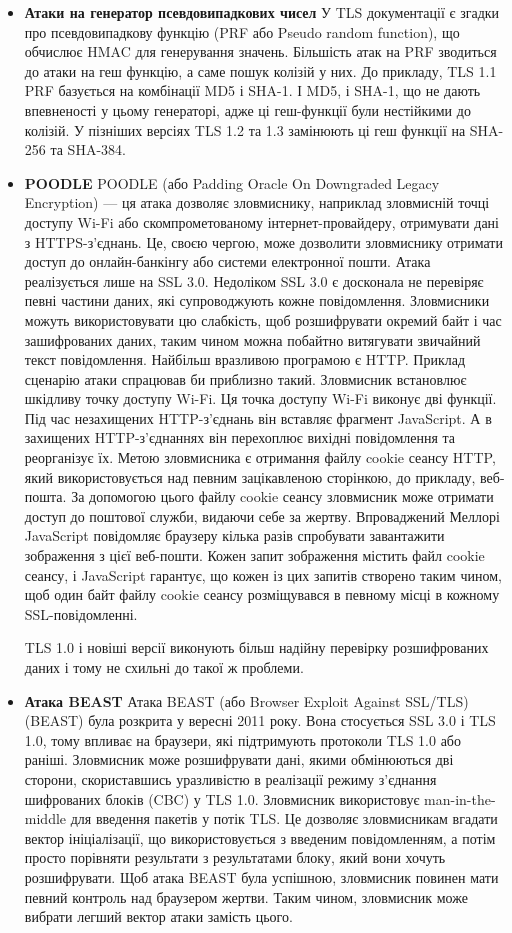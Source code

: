 \begin{itemize}
    \item \textbf{Атаки на генератор псевдовипадкових чисел}
    У TLS документації є згадки про псевдовипадкову функцію (PRF або Pseudo random function), що обчислює HMAC для генерування значень. Більшість атак на PRF зводиться до атаки на геш функцію, а саме пошук колізій у них. До прикладу, TLS 1.1 PRF базується на комбінації MD5 і SHA-1. І MD5, і SHA-1, що не дають впевненості у цьому генераторі, адже ці геш-функції були нестійкими до колізій. У пізніших версіях TLS 1.2 та 1.3 замінюють ці геш функції на SHA-256 та SHA-384.
    \item \textbf{POODLE}
    POODLE (або Padding Oracle On Downgraded Legacy Encryption) — ця атака дозволяє зловмиснику, наприклад зловмисній точці доступу Wi-Fi або скомпрометованому інтернет-провайдеру, отримувати дані з HTTPS-з’єднань. Це, своєю чергою, може дозволити зловмиснику отримати доступ до онлайн-банкінгу або системи електронної пошти.
    Атака реалізується лише на SSL 3.0. Недоліком SSL 3.0 є досконала не перевіряє певні частини даних, які супроводжують кожне повідомлення. Зловмисники можуть використовувати цю слабкість, щоб розшифрувати окремий байт і час зашифрованих даних, таким чином можна побайтно витягувати звичайний текст повідомлення.
    Найбільш вразливою програмою є HTTP. Приклад сценарію атаки спрацював би приблизно такий. Зловмисник встановлює шкідливу точку доступу Wi-Fi. Ця точка доступу Wi-Fi виконує дві функції. Під час незахищених HTTP-з’єднань він вставляє фрагмент JavaScript. А в захищених HTTP-з’єднаннях він перехоплює вихідні повідомлення та реорганізує їх. Метою зловмисника є отримання файлу cookie сеансу HTTP, який використовується над певним зацікавленою сторінкою, до прикладу, веб-пошта. За допомогою цього файлу cookie сеансу зловмисник може отримати доступ до поштової служби, видаючи себе за жертву. Впроваджений Меллорі JavaScript повідомляє браузеру кілька разів спробувати завантажити зображення з цієї веб-пошти. Кожен запит зображення містить файл cookie сеансу, і JavaScript гарантує, що кожен із цих запитів створено таким чином, щоб один байт файлу cookie сеансу розміщувався в певному місці в кожному SSL-повідомленні.
    
    TLS 1.0 і новіші версії виконують більш надійну перевірку розшифрованих даних і тому не схильні до такої ж проблеми.
    
    \item \textbf{Атака BEAST}
    Атака BEAST (або Browser Exploit Against SSL/TLS) (BEAST) була розкрита у вересні 2011 року. Вона стосується SSL 3.0 і TLS 1.0, тому впливає на браузери, які підтримують протоколи TLS 1.0 або раніші. Зловмисник може розшифрувати дані, якими обмінюються дві сторони, скориставшись уразливістю в реалізації режиму з’єднання шифрованих блоків (CBC) у TLS 1.0.
    Зловмисник використовує man-in-the-middle для введення пакетів у потік TLS. Це дозволяє зловмисникам вгадати вектор ініціалізації, що використовується з введеним повідомленням, а потім просто порівняти результати з результатами блоку, який вони хочуть розшифрувати.
    Щоб атака BEAST була успішною, зловмисник повинен мати певний контроль над браузером жертви. Таким чином, зловмисник може вибрати легший вектор атаки замість цього.
    

\end{itemize}
